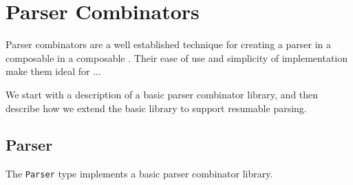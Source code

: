 \section{Parser Combinators}

Parser combinators are a well established technique for creating a parser in a composable in a composable . Their ease of use and simplicity of implementation make them ideal for ...

We start with a description of a basic parser combinator library, and then describe how we extend the basic library to support resumable parsing.


\subsection{Parser}

The \lstinline{Parser} type implements a basic parser combinator library.
